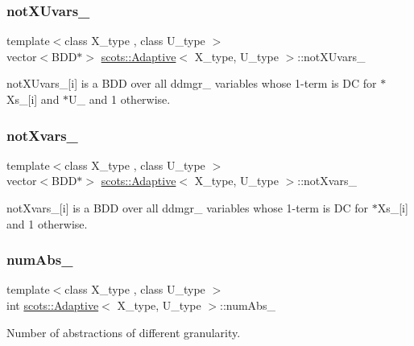 \subsubsection{\texorpdfstring{not\+X\+Uvars\+\_\+}{notXUvars\_}}
{\footnotesize\ttfamily template$<$class X\+\_\+type , class U\+\_\+type $>$ \\
vector$<$B\+DD$\ast$$>$ \hyperlink{classscots_1_1Adaptive}{scots\+::\+Adaptive}$<$ X\+\_\+type, U\+\_\+type $>$\+::not\+X\+Uvars\+\_\+}

not\+X\+Uvars\+\_\+\mbox{[}i\mbox{]} is a B\+DD over all ddmgr\+\_\+ variables whose 1-\/term is DC for $\ast$\+Xs\+\_\+\mbox{[}i\mbox{]} and $\ast$\+U\+\_\+ and 1 otherwise. \mbox{\label{classscots_1_1Adaptive_a8fbbf6976e589506c9e4c38045196c07}} 
\subsubsection{\texorpdfstring{not\+Xvars\+\_\+}{notXvars\_}}
{\footnotesize\ttfamily template$<$class X\+\_\+type , class U\+\_\+type $>$ \\
vector$<$B\+DD$\ast$$>$ \hyperlink{classscots_1_1Adaptive}{scots\+::\+Adaptive}$<$ X\+\_\+type, U\+\_\+type $>$\+::not\+Xvars\+\_\+}

not\+Xvars\+\_\+\mbox{[}i\mbox{]} is a B\+DD over all ddmgr\+\_\+ variables whose 1-\/term is DC for $\ast$\+Xs\+\_\+\mbox{[}i\mbox{]} and 1 otherwise. \mbox{\label{classscots_1_1Adaptive_afdd5a499494efeb8538346ad9e0f329c}} 
\subsubsection{\texorpdfstring{num\+Abs\+\_\+}{numAbs\_}}
{\footnotesize\ttfamily template$<$class X\+\_\+type , class U\+\_\+type $>$ \\
int \hyperlink{classscots_1_1Adaptive}{scots\+::\+Adaptive}$<$ X\+\_\+type, U\+\_\+type $>$\+::num\+Abs\+\_\+}

Number of abstractions of different granularity. \mbox{\label{classscots_1_1Adaptive_a753d83283386610f1a2283af5cbeba73}} 
